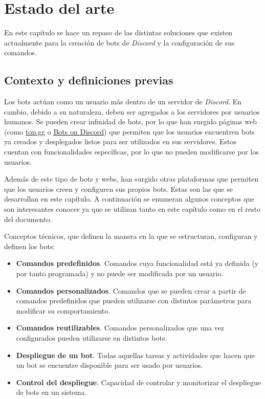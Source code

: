 \chapter{Estado del arte}

En este capítulo se hace un repaso de las distintas soluciones que existen actualmente para la creación de bots de \textit{Discord} y la configuración de sus comandos.

\section{Contexto y definiciones previas}

Los bots actúan como un usuario más dentro de un servidor de \textit{Discord}. En cambio, debido a su naturaleza, deben ser agregados a los servidores por usuarios humanos. Se pueden crear infinidad de bots, por lo que han surgido páginas web (como \href{https://top.gg/}{top.gg} o \href{https://bots.ondiscord.xyz/}{Bots on Discord}) que permiten que los usuarios encuentren bots ya creados y desplegados listos para ser utilizados en sus servidores. Estos cuentan con funcionalidades específicas, por lo que no pueden modificarse por los usuarios.

Además de este tipo de bots y webs, han surgido otras plataformas que permiten que los usuarios creen y configuren sus propios bots. Estas son las que se desarrollan en este capítulo. A continuación se enumeran algunos conceptos que son interesantes conocer ya que se utilizan tanto en este capítulo como en el resto del documento.

Conceptos técnicos, que definen la manera en la que se estructuran, configuran y definen los bots:

\begin{itemize}
	\item \textbf{Comandos predefinidos}. Comandos cuya funcionalidad está ya definida (y por tanto programada) y no puede ser modificada por un usuario.
	\item \textbf{Comandos personalizados}. Comandos que se pueden crear a partir de comandos predefinidos que pueden utilizarse con distintos parámetros para modificar su comportamiento.
	\item \textbf{Comandos reutilizables}. Comandos personalizados que una vez configurados pueden utilizarse en distintos bots.
	\item \textbf{Despliegue de un bot}. Todas aquellas tareas y actividades que hacen que un bot se encuentre disponible para ser usado por usuarios.
	\item \textbf{Control del despliegue}. Capacidad de controlar y monitorizar el despliegue de bots en un sistema.
\end{itemize}

